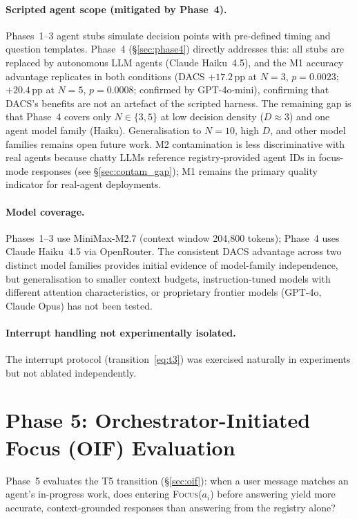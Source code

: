 \documentclass{article}
\begin{document}
\paragraph{Scripted agent scope (mitigated by Phase~4).}
Phases~1--3 agent stubs simulate decision points with pre-defined timing
and question templates.
Phase~4 (\S\ref{sec:phase4}) directly addresses this: all stubs are
replaced by autonomous LLM agents (Claude Haiku~4.5), and the M1 accuracy
advantage replicates in both conditions (DACS $+17.2$\,pp at $N{=}3$,
$p{=}0.0023$; $+20.4$\,pp at $N{=}5$, $p{=}0.0008$; confirmed by
GPT-4o-mini), confirming that DACS's benefits are not an artefact of
the scripted harness.
The remaining gap is that Phase~4 covers only $N{\in}\{3,5\}$ at low
decision density ($D{\approx}3$) and one agent model family (Haiku).
Generalisation to $N=10$, high $D$, and other model families remains
open future work.
M2 contamination is less discriminative with real agents because
chatty LLMs reference registry-provided agent IDs in focus-mode
responses (see \S\ref{sec:contam_gap}); M1 remains the primary quality
indicator for real-agent deployments.

\paragraph{Model coverage.}
Phases~1--3 use MiniMax-M2.7 (context window 204{,}800 tokens);
Phase~4 uses Claude Haiku~4.5 via OpenRouter.
The consistent DACS advantage across two distinct model families provides
initial evidence of model-family independence, but generalisation to
smaller context budgets, instruction-tuned models with different attention
characteristics, or proprietary frontier models (GPT-4o, Claude Opus)
has not been tested.

\paragraph{Interrupt handling not experimentally isolated.}
The interrupt protocol (transition~\eqref{eq:t3}) was exercised naturally in
experiments but not ablated independently.

\section{Phase 5: Orchestrator-Initiated Focus (OIF) Evaluation}
\label{sec:phase5}

Phase~5 evaluates the T5 transition (\S\ref{sec:oif}):
when a user message matches an agent's in-progress work,
does entering \textsc{Focus}($a_i$) before answering yield
more accurate, context-grounded responses than answering from
the registry alone?
\end{document}
